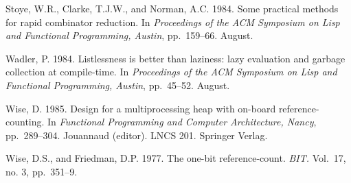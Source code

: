 \begin{references}
        \item Stoye, W.R., Clarke, T.J.W., and Norman, A.C. 1984. Some practical methods for
        rapid combinator reduction. In \textit{Proceedings of the ACM Symposium on Lisp and
            Functional Programming, Austin}, pp.~159--66. August.

        \item Wadler, P. 1984. Listlessness is better than laziness: lazy evaluation and garbage
        collection at compile-time. In \textit{Proceedings of the ACM Symposium on Lisp and
            Functional Programming, Austin}, pp.~45--52. August.

        \item Wise, D. 1985. Design for a multiprocessing heap with on-board reference-counting.
        In \textit{Functional Programming and Computer Architecture, Nancy}, pp.~289--304.
        Jouannaud (editor). LNCS 201. Springer Verlag.

        \item Wise, D.S., and Friedman, D.P. 1977. The one-bit reference-count. \textit{BIT.} Vol.~17, no.
        3, pp.~351--9.

    \end{references}